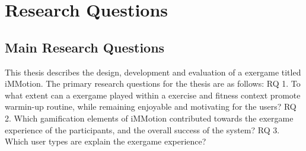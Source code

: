 \chapter{Research Questions}\label{chapter:researchq}


\section{Main Research Questions}

This thesis describes the design, development and evaluation of a exergame
titled iMMotion. The primary research questions for the thesis are as follows:
RQ 1. To what extent can a exergame played within a exercise and fitness
context promote warmin-up routine, while remaining enjoyable and motivating for the users?
RQ 2. Which gamification elements of iMMotion contributed towards the exergame
experience of the participants, and the overall success of the system?
RQ 3. Which user types are  explain the
exergame experience?
